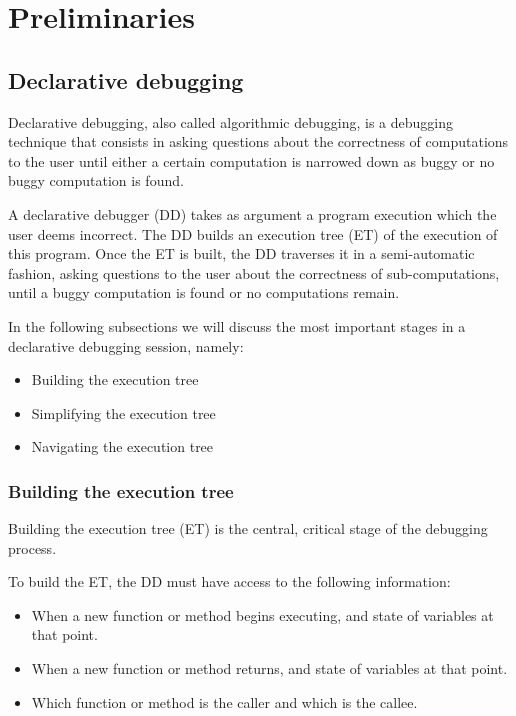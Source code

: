 \chapter{Preliminaries}
\label{cap:preliminares}

\section{Declarative debugging}
Declarative debugging, also called algorithmic debugging, is a debugging technique that consists in asking questions about the correctness of computations to the user until either a certain computation is narrowed down as buggy or no buggy computation is found.

A declarative debugger (DD) takes as argument a program execution which the user deems incorrect.
The DD builds an execution tree (ET) of the execution of this program.
Once the ET is built, the DD traverses it in a semi-automatic fashion, asking questions to the user about the correctness of sub-computations, until a buggy computation is found or no computations remain. 


In the following subsections we will discuss the most important stages in a declarative debugging session, namely:
\begin{itemize}
    \item Building the execution tree
    \item Simplifying the execution tree
    \item Navigating the execution tree
\end{itemize}
\subsection{Building the execution tree}

Building the execution tree (ET) is the central, critical stage of the debugging process.

To build the ET, the DD must have access to the following information:
\begin{itemize}
    \item When a new function or method begins executing, and state of variables at that point. 
    \item When a new function or method returns, and state of variables at that point.
    \item Which function or method is the caller and which is the callee. 
\end{itemize}

